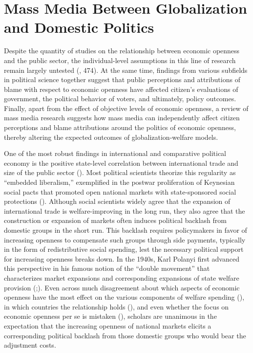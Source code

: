 \documentclass[12pt]{report}
\begin{document}
\section{Mass Media Between Globalization and Domestic Politics}

Despite the quantity of studies on the relationship between economic openness and the public sector,
the individual-level assumptions in this line of research remain largely untested
(\citealt{Hays:2005vo}, 474). At the same time, findings from various subfields in political science
together suggest that public perceptions and attributions of blame with respect to economic openness
have affected citizen's evaluations of government, the political behavior of voters, and ultimately,
policy outcomes. Finally, apart from the effect of objective levels of economic openness, a review
of mass media research suggests how mass media can independently affect citizen perceptions and
blame attributions around the politics of economic openness, thereby altering the expected outcomes
of globalization-welfare models.

One of the most robust findings in international and comparative political economy is the positive
state-level correlation between international trade and size of the public sector
(\citealt{Cameron:1978vb,Rodrik:1998te,Garrett:1995tj,Adsera:2002vt}). Most political scientists
theorize this regularity as ``embedded liberalism,'' exemplified in the postwar
proliferation of Keynesian social pacts that promoted open national markets with state-sponsored
social protections (\citealt{Ruggie:1982wx}). Although social scientists widely agree that the
expansion of international trade is welfare-improving in the long run, they also agree that the
construction or expansion of markets often induces political backlash from domestic groups in the
short run. This backlash requires policymakers in favor of increasing openness to compensate such
groups through side payments, typically in the form of redistributive social spending, lest the
necessary political support for increasing openness breaks down. In the 1940s, Karl Polanyi first
advanced this perspective in his famous notion of the ``double movement'' that
characterizes market expansions and corresponding expansions of state welfare provision
(\citealt[79, 385]{Polanyi:2001vc};). Even across much disagreement about which aspects of economic
openness have the most effect on the various components of welfare spending
(\citealt{Mares:2004el,Ansell:2008wl,Burgoon:2001dp}), in which countries the relationship holds
(\citealt{Rudra:2002ui,Anonymous:2008ur}), and even whether the focus on economic openness per se is
mistaken (\citealt{Kim:2007wu,Oatley:2011hv}), scholars are unanimous in the expectation that the
increasing openness of national markets elicits a corresponding political backlash from those
domestic groups who would bear the adjustment costs.
\end{document}
